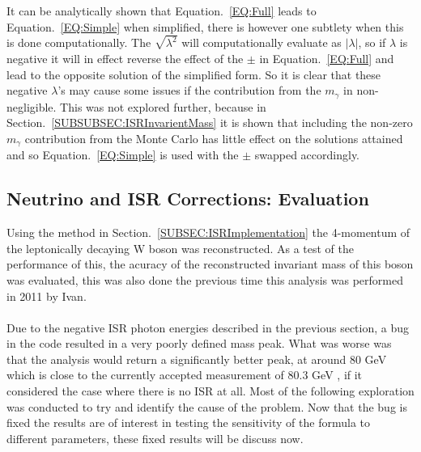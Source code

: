 It can be analytically shown that Equation.~\ref{EQ:Full} leads to Equation.~\ref{EQ:Simple} when simplified, there is however one subtlety when this is done computationally. The $\sqrt{ {\lambda}^{2}}$ will computationally evaluate as $|{\lambda}|$, so if $\lambda$ is negative it will in effect reverse the effect of the $\pm$ in Equation.~\ref{EQ:Full} and lead to the opposite solution of the simplified form. So it is clear that these negative $\lambda$'s may cause some issues if the contribution from the ${m}_{\gamma}$ in non-negligible. This was not explored further, because in Section.~\ref{SUBSUBSEC:ISRInvarientMass} it is shown that including the non-zero ${m}_{\gamma}$ contribution from the Monte Carlo has little effect on the solutions attained and so Equation.~\ref{EQ:Simple} is used with the $\pm$ swapped accordingly.

\subsection{Neutrino and ISR Corrections: Evaluation}
\label{SUBSEC:ISREvaluation}
Using the method in Section.~\ref{SUBSEC:ISRImplementation} the 4-momentum of the leptonically decaying W boson was reconstructed. As a test of the performance of this, the acuracy of the reconstructed invariant mass of this boson was evaluated, this was also done the previous time this analysis was performed in 2011 by Ivan.
\\\\
Due to the negative ISR photon energies described in the previous section, a bug in the code resulted in a very poorly defined mass peak. What was worse was that the analysis would return a significantly better peak, at around 80 GeV which is close to the currently accepted measurement of 80.3 GeV \cite{pdgLive}, if it considered the case where there is no ISR at all. Most of the following exploration was conducted to try and identify the cause of the problem. Now that the bug is fixed the results are of interest in testing the sensitivity of the formula to different parameters, these fixed results will be discuss now.

